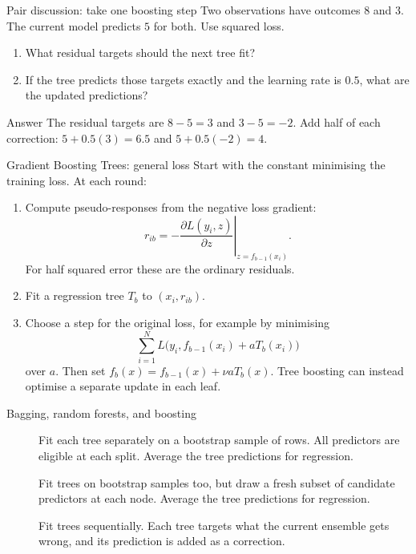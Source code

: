 \documentclass[10pt]{beamer}
\begin{document}
\begin{frame}{Pair discussion: take one boosting step}
Two observations have outcomes $8$ and $3$. The current model predicts $5$ for both. Use squared loss.

\begin{enumerate}
\item What residual targets should the next tree fit?
\item If the tree predicts those targets exactly and the learning rate is $0.5$, what are the updated predictions?
\end{enumerate}
\pause
\begin{block}{Answer}
The residual targets are $8-5=3$ and $3-5=-2$.
Add half of each correction: $5+0.5(3)=6.5$ and $5+0.5(-2)=4$.
\end{block}
\end{frame}

\begin{frame}{Gradient Boosting Trees: general loss}
Start with the constant minimising the training loss. At each round:
\begin{enumerate}
\item Compute pseudo-responses from the negative loss gradient:
\[
r_{ib}=-\left.\frac{\partial L(y_i,z)}{\partial z}\right|_{z=f_{b-1}(x_i)}.
\]
For half squared error these are the ordinary residuals.
\item Fit a regression tree $T_b$ to $(x_i,r_{ib})$.
\item Choose a step for the original loss, for example by minimising
\[
\sum_{i=1}^N L\big(y_i,f_{b-1}(x_i)+aT_b(x_i)\big)
\]
over $a$. Then set $f_b(x)=f_{b-1}(x)+\nu aT_b(x)$.
Tree boosting can instead optimise a separate update in each leaf.
\end{enumerate}
\end{frame}

\begin{frame}{Bagging, random forests, and boosting}
\begin{description}
\item[] Fit each tree separately on a bootstrap sample of rows. All predictors are eligible at each split. Average the tree predictions for regression.
\pause
\item[] Fit trees on bootstrap samples too, but draw a fresh subset of candidate predictors at each node. Average the tree predictions for regression.
\pause
\item[] Fit trees sequentially. Each tree targets what the current ensemble gets wrong, and its prediction is added as a correction.
\end{description}
\end{frame}
\end{document}
